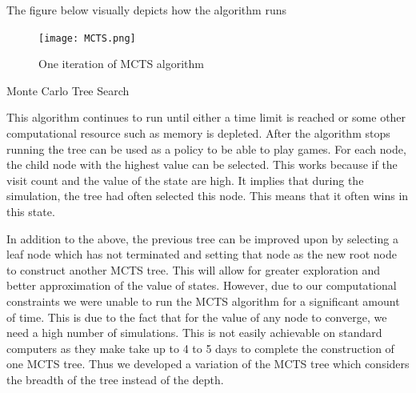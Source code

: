 \documentclass[a4paper,12pt,table]{article}
\begin{document}
The figure below visually depicts how the algorithm runs \par

\begin{figure}[h!]
    \begin{center}
        \texttt{[image: MCTS.png]}
        \caption{One iteration of MCTS algorithm \cite{Reinforcement learning: An introduction}}
        \label{fig:}
    \end{center}
\end{figure}

\begin{algorithm}[H]
    \SetAlgoLined
    \caption{Monte Carlo Tree Search}
\end{algorithm}

This algorithm continues to run until either a time limit is reached or some other computational resource such as memory is depleted. After the algorithm stops running the tree can be used as a policy to be able to play games. For each node, the child node with the highest value can be selected. This works because if the visit count and the value of the state are high. It implies that during the simulation, the tree had often selected this node. This means that it often wins in this state. \par

In addition to the above, the previous tree can be improved upon by selecting a leaf node which has not terminated and setting that node as the new root node to construct another MCTS tree. This will allow for greater exploration and better approximation of the value of states. However, due to our computational constraints we were unable to run the MCTS algorithm for a significant amount of time. This is due to the fact that for the value of any node to converge, we need a high number of simulations. This is not easily achievable on standard computers as they make take up to 4 to 5 days to complete the construction of one MCTS tree. Thus we developed a variation of the MCTS tree which considers the breadth of the tree instead of the depth. \par
\end{document}
